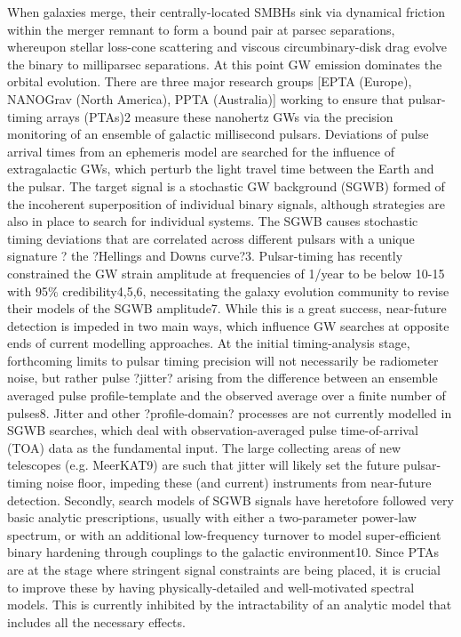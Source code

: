 \documentclass[11pt,letterpaper,sans]{moderncv} %
\begin{document}
When galaxies merge, their centrally-located SMBHs sink via dynamical friction within the merger remnant to form a bound pair at parsec separations, whereupon stellar loss-cone scattering and viscous circumbinary-disk drag evolve the binary to milliparsec separations. At this point GW emission dominates the orbital evolution. There are three major research groups [EPTA (Europe), NANOGrav (North America), PPTA (Australia)] working to ensure that pulsar-timing arrays (PTAs)2 measure these nanohertz GWs via the precision monitoring of an ensemble of galactic millisecond pulsars. Deviations of pulse arrival times from an ephemeris model are searched for the influence of extragalactic GWs, which perturb the light travel time between the Earth and the pulsar. The target signal is a stochastic GW background (SGWB) formed of the incoherent superposition of individual binary signals, although strategies are also in place to search for individual systems. The SGWB causes stochastic timing deviations that are correlated across different pulsars with a unique signature ? the ?Hellings and Downs curve?3.
	Pulsar-timing has recently constrained the GW strain amplitude at frequencies of 1/year to be below    10-15 with 95$\%$ credibility4,5,6, necessitating the galaxy evolution community to revise their models of the SGWB amplitude7. While this is a great success, near-future detection is impeded in two main ways, which influence GW searches at opposite ends of current modelling approaches. At the initial timing-analysis stage, forthcoming limits to pulsar timing precision will not necessarily be radiometer noise, but rather pulse ?jitter? arising from the difference between an ensemble averaged pulse profile-template and the observed average over a finite number of pulses8. Jitter and other ?profile-domain? processes are not currently modelled in SGWB searches, which deal with observation-averaged pulse time-of-arrival (TOA) data as the fundamental input. The large collecting areas of new telescopes (e.g. MeerKAT9) are such that jitter will likely set the future pulsar-timing noise floor, impeding these (and current) instruments from near-future detection. Secondly, search models of SGWB signals have heretofore followed very basic analytic prescriptions, usually with either a two-parameter power-law spectrum, or with an additional low-frequency turnover to model super-efficient binary hardening through couplings to the galactic environment10. Since PTAs are at the stage where stringent signal constraints are being placed, it is crucial to improve these by having physically-detailed and well-motivated spectral models. This is currently inhibited by the intractability of an analytic model that includes all the necessary effects.
\end{document}
